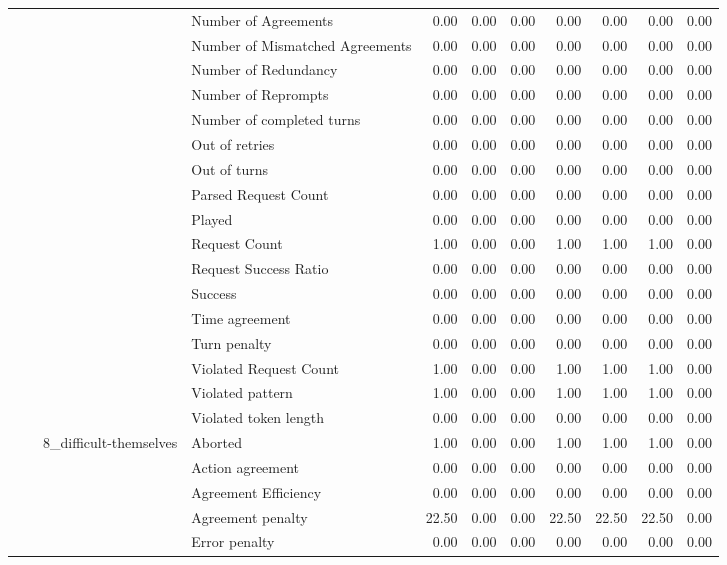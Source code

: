 \begin{tabular}{llllrrrrrrr}
 &  &  & Number of Agreements & 0.00 & 0.00 & 0.00 & 0.00 & 0.00 & 0.00 & 0.00 \\
 &  &  & Number of Mismatched Agreements & 0.00 & 0.00 & 0.00 & 0.00 & 0.00 & 0.00 & 0.00 \\
 &  &  & Number of Redundancy & 0.00 & 0.00 & 0.00 & 0.00 & 0.00 & 0.00 & 0.00 \\
 &  &  & Number of Reprompts & 0.00 & 0.00 & 0.00 & 0.00 & 0.00 & 0.00 & 0.00 \\
 &  &  & Number of completed turns & 0.00 & 0.00 & 0.00 & 0.00 & 0.00 & 0.00 & 0.00 \\
 &  &  & Out of retries & 0.00 & 0.00 & 0.00 & 0.00 & 0.00 & 0.00 & 0.00 \\
 &  &  & Out of turns & 0.00 & 0.00 & 0.00 & 0.00 & 0.00 & 0.00 & 0.00 \\
 &  &  & Parsed Request Count & 0.00 & 0.00 & 0.00 & 0.00 & 0.00 & 0.00 & 0.00 \\
 &  &  & Played & 0.00 & 0.00 & 0.00 & 0.00 & 0.00 & 0.00 & 0.00 \\
 &  &  & Request Count & 1.00 & 0.00 & 0.00 & 1.00 & 1.00 & 1.00 & 0.00 \\
 &  &  & Request Success Ratio & 0.00 & 0.00 & 0.00 & 0.00 & 0.00 & 0.00 & 0.00 \\
 &  &  & Success & 0.00 & 0.00 & 0.00 & 0.00 & 0.00 & 0.00 & 0.00 \\
 &  &  & Time agreement & 0.00 & 0.00 & 0.00 & 0.00 & 0.00 & 0.00 & 0.00 \\
 &  &  & Turn penalty & 0.00 & 0.00 & 0.00 & 0.00 & 0.00 & 0.00 & 0.00 \\
 &  &  & Violated Request Count & 1.00 & 0.00 & 0.00 & 1.00 & 1.00 & 1.00 & 0.00 \\
 &  &  & Violated pattern & 1.00 & 0.00 & 0.00 & 1.00 & 1.00 & 1.00 & 0.00 \\
 &  &  & Violated token length & 0.00 & 0.00 & 0.00 & 0.00 & 0.00 & 0.00 & 0.00 \\
\cline{3-11}
 &  & \multirow[t]{27}{*}{8_difficult-themselves} & Aborted & 1.00 & 0.00 & 0.00 & 1.00 & 1.00 & 1.00 & 0.00 \\
 &  &  & Action agreement & 0.00 & 0.00 & 0.00 & 0.00 & 0.00 & 0.00 & 0.00 \\
 &  &  & Agreement Efficiency & 0.00 & 0.00 & 0.00 & 0.00 & 0.00 & 0.00 & 0.00 \\
 &  &  & Agreement penalty & 22.50 & 0.00 & 0.00 & 22.50 & 22.50 & 22.50 & 0.00 \\
 &  &  & Error penalty & 0.00 & 0.00 & 0.00 & 0.00 & 0.00 & 0.00 & 0.00 \\

\end{tabular}
